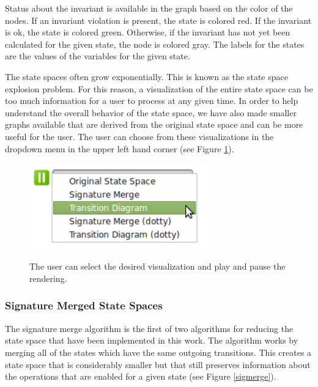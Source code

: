 Status about the invariant is available in the graph based on the color of the nodes. If an invariant violation is present, the state is colored red. If the invariant is ok, the state is colored green. Otherwise, if the invariant has not yet been calculated for the given state, the node is colored gray. The labels for the states are the values of the variables for the given state.

The state spaces often grow exponentially. This is known as the state space explosion problem. For this reason, a visualization of the entire state space can be too much information for a user to process at any given time. In order to help understand the overall behavior of the state space, we have also made smaller graphs available that are derived from the original state space and can be more useful for the user. The user can choose from these visualizations in the dropdown menu in the upper left hand corner (see Figure \ref{userSelect}).

\begin{center}
\begin{figure}[h!]
\centering
\includegraphics[width=8cm]{bilder/menu.png}
\caption{The user can select the desired visualization and play and pause the rendering.}
\label{userSelect}
\end{figure}
\end{center}

\subsubsection{Signature Merged State Spaces}

The signature merge algorithm is the first of two algorithms for reducing the state space that have been implemented in this work. The algorithm works by merging all of the states which have the same outgoing transitions. This creates a state space that is considerably smaller but that still preserves information about the operations that are enabled for a given state \cite{LeTu05_8} (see Figure \ref{sigmerge}). 

